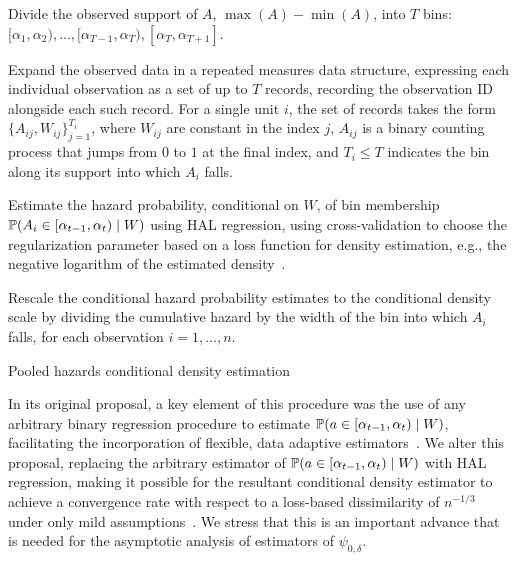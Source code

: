 \begin{algorithm}[H]
\label{alg:pooled_haz_dens}
\SetAlgoLined
{}
\BlankLine

Divide the observed support of $A$, $\max(A) - \min(A)$, into $T$ bins:
$[\alpha_1, \alpha_2), \ldots, [\alpha_{T-1}, \alpha_T), [\alpha_T,
\alpha_{T+1}]$.

Expand the observed data in a repeated measures data structure, expressing each
individual observation as a set of up to $T$ records, recording the observation
ID alongside each such record. For a single unit $i$, the set of records takes
the form $\{A_{ij}, W_{ij}\}_{j=1}^{T_i}$, where $W_{ij}$ are constant in the
index $j$, $A_{ij}$ is a binary counting process that jumps from $0$ to $1$ at
the final index, and $T_i \leq T$ indicates the bin along its support into which
$A_i$ falls.

Estimate the hazard probability, conditional on $W$, of bin membership
$\mathbb{P}(A_i \in [\alpha_{t-1}, \alpha_t) \mid W)$ using HAL regression, using
cross-validation to choose the regularization parameter based on a loss function
for density estimation, e.g., the negative logarithm of the estimated
density~\citep{dudoit2005asymptotics}.

Rescale the conditional hazard probability estimates to the conditional density
scale by dividing the cumulative hazard by the width of the bin into which $A_i$
falls, for each observation $i = 1, \ldots, n$.
\BlankLine

\caption{Pooled hazards conditional density estimation}
\end{algorithm}

In its original proposal, a key element of this procedure was the use of any
arbitrary binary regression procedure to estimate $\mathbb{P}(a \in [\alpha_{t-1},
\alpha_t) \mid W)$, facilitating the incorporation of flexible, data adaptive
estimators~\citep{diaz2011super}. We alter this proposal, replacing the
arbitrary estimator of $\mathbb{P}(a \in [\alpha_{t-1}, \alpha_t) \mid W)$ with HAL
regression, making it possible for the resultant conditional density estimator
to achieve a convergence rate with respect to a loss-based dissimilarity of
$n^{-1/3}$ under only mild assumptions~\citep{vdl2017generally, vdl2017uniform}.
We stress that this is an important advance that is needed for the asymptotic
analysis of estimators of $\psi_{0,\delta}$.

